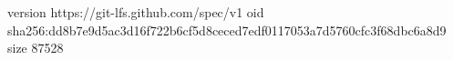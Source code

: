 version https://git-lfs.github.com/spec/v1
oid sha256:dd8b7e9d5ac3d16f722b6cf5d8ceced7edf0117053a7d5760cfc3f68dbc6a8d9
size 87528
